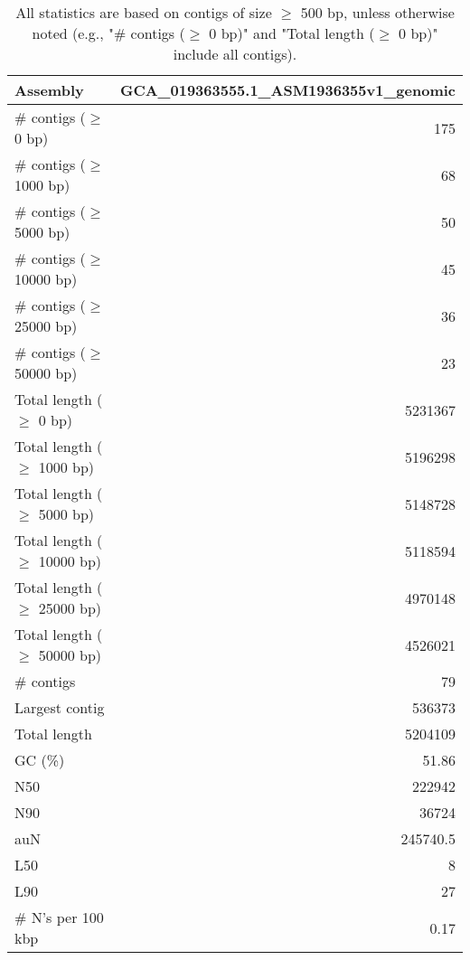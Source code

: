 \documentclass[12pt,a4paper]{article}
\begin{document}
\begin{table}[ht]
\begin{center}
\caption{All statistics are based on contigs of size $\geq$ 500 bp, unless otherwise noted (e.g., "\# contigs ($\geq$ 0 bp)" and "Total length ($\geq$ 0 bp)" include all contigs).}
\begin{tabular}{|l*{1}{|r}|}
\hline
Assembly & GCA\_019363555.1\_ASM1936355v1\_genomic \\ \hline
\# contigs ($\geq$ 0 bp) & 175 \\ \hline
\# contigs ($\geq$ 1000 bp) & 68 \\ \hline
\# contigs ($\geq$ 5000 bp) & 50 \\ \hline
\# contigs ($\geq$ 10000 bp) & 45 \\ \hline
\# contigs ($\geq$ 25000 bp) & 36 \\ \hline
\# contigs ($\geq$ 50000 bp) & 23 \\ \hline
Total length ($\geq$ 0 bp) & 5231367 \\ \hline
Total length ($\geq$ 1000 bp) & 5196298 \\ \hline
Total length ($\geq$ 5000 bp) & 5148728 \\ \hline
Total length ($\geq$ 10000 bp) & 5118594 \\ \hline
Total length ($\geq$ 25000 bp) & 4970148 \\ \hline
Total length ($\geq$ 50000 bp) & 4526021 \\ \hline
\# contigs & 79 \\ \hline
Largest contig & 536373 \\ \hline
Total length & 5204109 \\ \hline
GC (\%) & 51.86 \\ \hline
N50 & 222942 \\ \hline
N90 & 36724 \\ \hline
auN & 245740.5 \\ \hline
L50 & 8 \\ \hline
L90 & 27 \\ \hline
\# N's per 100 kbp & 0.17 \\ \hline
\end{tabular}
\end{center}
\end{table}
\end{document}

